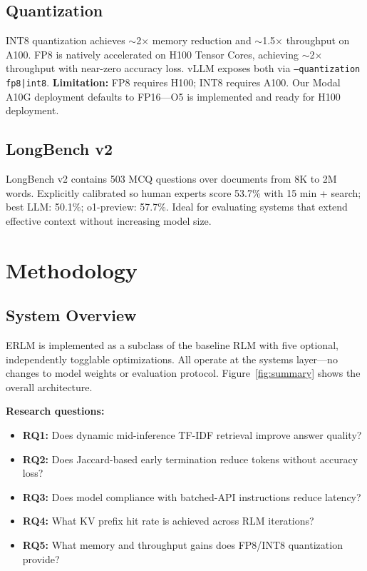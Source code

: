 \documentclass{article}
\begin{document}
\subsection{Quantization}
INT8 quantization \citep{dettmers2022llmint8} achieves $\sim$2$\times$ memory reduction and $\sim$1.5$\times$ throughput on A100. FP8 \citep{micikevicius2022fp8} is natively accelerated on H100 Tensor Cores, achieving $\sim$2$\times$ throughput with near-zero accuracy loss. vLLM exposes both via \texttt{--quantization fp8|int8}. \textbf{Limitation:} FP8 requires H100; INT8 requires A100. Our Modal A10G deployment defaults to FP16---O5 is implemented and ready for H100 deployment.

\subsection{LongBench v2}
LongBench v2 \citep{bai2024longbench} contains 503 MCQ questions over documents from 8K to 2M words. Explicitly calibrated so human experts score 53.7\% with 15 min + search; best LLM: 50.1\%; o1-preview: 57.7\%. Ideal for evaluating systems that extend effective context without increasing model size.

\section{Methodology}

\subsection{System Overview}
ERLM is implemented as a subclass of the baseline RLM with five optional, independently togglable optimizations. All operate at the systems layer---no changes to model weights or evaluation protocol. Figure~\ref{fig:summary} shows the overall architecture.

\textbf{Research questions:}
\begin{itemize}[leftmargin=*, noitemsep]
    \item \textbf{RQ1:} Does dynamic mid-inference TF-IDF retrieval improve answer quality?
    \item \textbf{RQ2:} Does Jaccard-based early termination reduce tokens without accuracy loss?
    \item \textbf{RQ3:} Does model compliance with batched-API instructions reduce latency?
    \item \textbf{RQ4:} What KV prefix hit rate is achieved across RLM iterations?
    \item \textbf{RQ5:} What memory and throughput gains does FP8/INT8 quantization provide?
\end{itemize}
\end{document}
